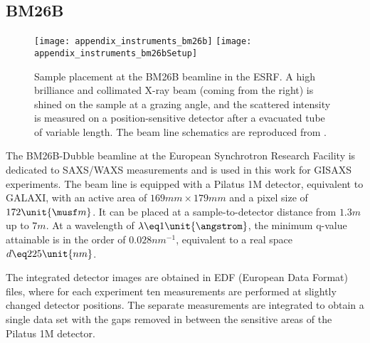 \documentclass[\main/dresen_thesis.tex]{subfiles}
\begin{document}
  \subsection{BM26B}\label{ch:lss:BM26B}
    \begin{figure}[ht]
      \centering
      \texttt{[image: appendix\_instruments\_bm26b]}
      \texttt{[image: appendix\_instruments\_bm26bSetup]}
      \caption{\label{fig:lss:BM26B}Sample placement at the BM26B beamline in the ESRF. A high brilliance and collimated X-ray beam (coming from the right) is shined on the sample at a grazing angle, and the scattered intensity is measured on a position-sensitive detector after a evacuated tube of variable length. The beam line schematics are reproduced from \cite{Bras_2003_Recen}.}
    \end{figure}

    The BM26B-Dubble beamline at the European Synchrotron Research Facility is dedicated to SAXS/WAXS measurements and is used in this work for GISAXS experiments.
    The beam line is equipped with a Pilatus 1M detector, equivalent to GALAXI, with an active area of $169 \unit{mm} \times 179 \unit{mm}$ and a pixel size of $172 \unit{\musf m}$.
    It can be placed at a sample-to-detector distance from $1.3 \unit{m}$ up to $7 \unit{m}$.
    At a wavelength of $\lambda \eq 1 \unit{\angstrom}$, the minimum q-value attainable is in the order of $0.028 \unit{nm^{-1}}$, equivalent to a real space $d \eq 225 \unit{nm}$.

    The integrated detector images are obtained in EDF (European Data Format) files, where for each experiment ten measurements are performed at slightly changed detector positions.
    The separate measurements are integrated to obtain a single data set with the gaps removed in between the sensitive areas of the Pilatus 1M detector.
\end{document}
